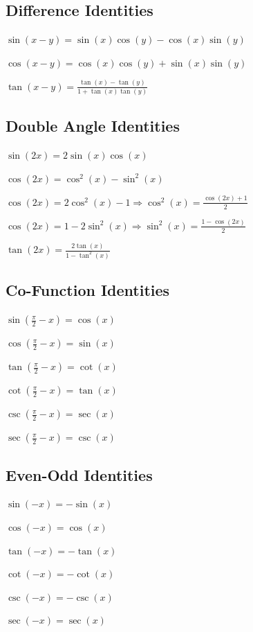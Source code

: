 \documentclass[8pt,a4paper]{extarticle}     %
\theoremstyle{definition}
\theoremstyle{definition}
\theoremstyle{definition}
\begin{document}
\begin{multicols}{4}
\subsection{Difference Identities}
\begin{eqlist}
	\item $\sin(x - y) = \sin(x)\cos(y) - \cos(x)\sin(y)$
	\item $\cos(x - y) = \cos(x)\cos(y) + \sin(x)\sin(y)$
	\item $\tan(x - y) = \frac{\tan(x) - \tan(y)}{1 + \tan(x)\tan(y)}$
\end{eqlist}

\subsection{Double Angle Identities}
\begin{eqlist}
	\item $\sin(2x) = 2\sin(x)\cos(x)$
	\item $\cos(2x) = \cos^2(x) - \sin^2(x) $
	\item $\cos(2x) = 2\cos^2(x) - 1 \Rightarrow \cos^2(x) = \frac{\cos(2x)+1}{2}$
	\item $\cos(2x) = 1 - 2\sin^2(x) \Rightarrow \sin^2(x) = \frac{1-\cos(2x)}{2}$
	\item $\tan(2x) = \frac{2\tan(x)}{1-\tan^2(x)} $
\end{eqlist}

\subsection{Co-Function Identities}
\begin{eqlist}
	\item $\sin\left(\frac{\pi}{2}-x\right) = \cos(x)$
	\item $\cos\left(\frac{\pi}{2}-x\right) = \sin(x)$
	\item $\tan\left(\frac{\pi}{2}-x\right) = \cot(x)$
	\item $\cot\left(\frac{\pi}{2}-x\right) = \tan(x)$
	\item $\csc\left(\frac{\pi}{2}-x\right) = \sec(x)$
	\item $\sec\left(\frac{\pi}{2}-x\right) = \csc(x)$
\end{eqlist}

\subsection{Even-Odd Identities}
\begin{eqlist}
	\item $\sin(-x) = -\sin(x)$
	\item $\cos(-x) = \cos(x)$
	\item $\tan(-x) = -\tan(x)$
	\item $\cot(-x) = -\cot(x)$
	\item $\csc(-x) = -\csc(x)$
	\item $\sec(-x) = \sec(x)$
\end{eqlist}


\end{multicols}
\end{document}
